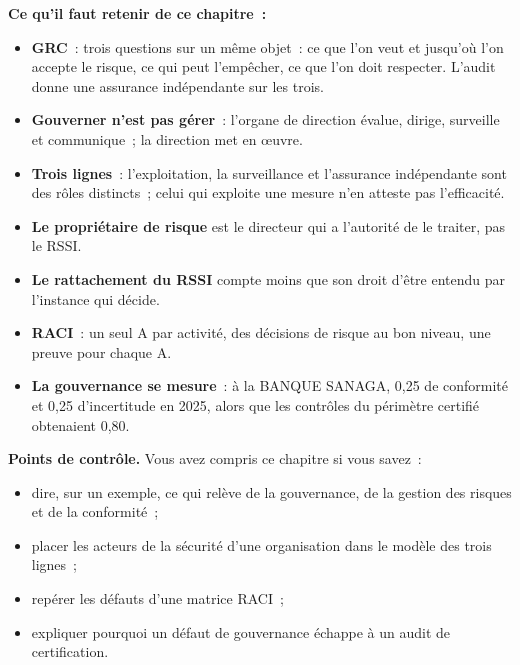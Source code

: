\begin{boxresume}
\textbf{Ce qu'il faut retenir de ce chapitre~:}
\begin{itemize}
    \item \textbf{GRC}~: trois questions sur un même objet~: ce que l'on
          veut et jusqu'où l'on accepte le risque, ce qui peut l'empêcher,
          ce que l'on doit respecter. L'audit donne une assurance
          indépendante sur les trois.
    \item \textbf{Gouverner n'est pas gérer}~: l'organe de direction évalue,
          dirige, surveille et communique~; la direction met en œuvre.
    \item \textbf{Trois lignes}~: l'exploitation, la surveillance et
          l'assurance indépendante sont des rôles distincts~; celui qui
          exploite une mesure n'en atteste pas l'efficacité.
    \item \textbf{Le propriétaire de risque} est le directeur qui a
          l'autorité de le traiter, pas le RSSI.
    \item \textbf{Le rattachement du RSSI} compte moins que son droit
          d'être entendu par l'instance qui décide.
    \item \textbf{RACI}~: un seul A par activité, des décisions de risque au
          bon niveau, une preuve pour chaque A.
    \item \textbf{La gouvernance se mesure}~: à la BANQUE SANAGA, 0,25 de
          conformité et 0,25 d'incertitude en 2025, alors que les
          contrôles du périmètre certifié obtenaient 0,80.
\end{itemize}
\end{boxresume}

\begin{boxinfo}
\textbf{Points de contrôle.} Vous avez compris ce chapitre si vous savez~:
\begin{itemize}
    \item dire, sur un exemple, ce qui relève de la gouvernance, de la
          gestion des risques et de la conformité~;
    \item placer les acteurs de la sécurité d'une organisation dans le
          modèle des trois lignes~;
    \item repérer les défauts d'une matrice RACI~;
    \item expliquer pourquoi un défaut de gouvernance échappe à un audit de
          certification.
\end{itemize}
\end{boxinfo}


